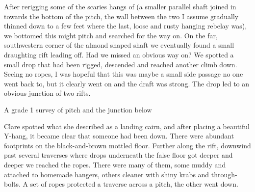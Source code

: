 After rerigging some of the scaries hangs of  (a smaller parallel shaft joined in towards the bottom of the pitch, the wall between the two I assume gradually thinned down to a few feet where the last, loose and rusty hanging rebelay was), we bottomed this might pitch and searched for the way on. On the far, southwestern corner of the almond shaped shaft  we eventually found a small draughting rift leading off. Had we missed an obvious way on? We spotted a small drop that had been rigged, descended and reached another climb down. Seeing no ropes, I was hopeful that this was maybe a small side passage no one went back to, but it clearly went on and the draft was strong. The drop led to an obvious junction of two rifts.

\begin{survey*}[t]
\checkoddpage \ifoddpage \forcerectofloat \else \forceversofloat \fi
\centering
{}
\caption[TTT pitch (grade 1)]{A grade 1 survey of \protect{} pitch and the \protect{} junction below }
\label{Grade 1 survey}
\end{survey*}

Clare spotted what she described as a landing cairn, and after placing a beautiful Y-hang, it became clear that someone had been down. There were abundant footprints on the black-and-brown mottled floor. Further along the rift, downwind past several traverses where drops underneath the false floor got deeper and deeper we reached the ropes. There were many of them, some muddy and attached to homemade hangers, others cleaner with shiny krabs and through-bolts. A set of ropes protected a traverse across a pitch, the other went down.

